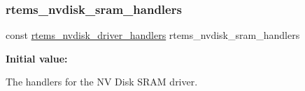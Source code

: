 \subsubsection{\texorpdfstring{rtems\_nvdisk\_sram\_handlers}{rtems\_nvdisk\_sram\_handlers}}
{\footnotesize\ttfamily const \mbox{\hyperlink{structrtems__nvdisk__driver__handlers}{rtems\+\_\+nvdisk\+\_\+driver\+\_\+handlers}} rtems\+\_\+nvdisk\+\_\+sram\+\_\+handlers}

{\bfseries Initial value\+:}
\begin{DoxyCode}{0}
\DoxyCodeLine{=}
\DoxyCodeLine{\{}
\DoxyCodeLine{\}}

\end{DoxyCode}
The handlers for the NV Disk S\+R\+AM driver. 